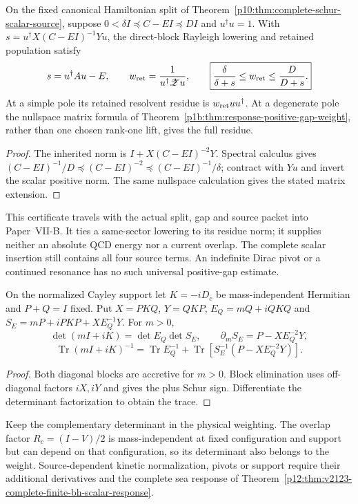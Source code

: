 \documentclass[12pt,a4paper]{article}
\begin{document}
\begin{corollary}
\label{p10:cor:schur-positive-gap-weight}
On the fixed canonical Hamiltonian split of
Theorem~\ref{p10:thm:complete-schur-scalar-source}, suppose
$0<\delta I\preceq C-EI\preceq DI$ and $u^\dagger u=1$.
With $s=u^\dagger X(C-EI)^{-1}Yu$, the direct-block Rayleigh lowering
and retained population satisfy
\[
 s=u^\dagger Au-E,\qquad
 w_{\rm ret}=\frac1{u^\dagger\mathscr Zu},\qquad
 \boxed{\frac{\delta}{\delta+s}\le w_{\rm ret}
                         \le\frac{D}{D+s}.}
\]
At a simple pole its retained resolvent residue is
$w_{\rm ret}uu^\dagger$.  At a degenerate pole the nullspace matrix
formula of Theorem~\ref{p1b:thm:response-positive-gap-weight}, rather than
one chosen rank-one lift, gives the full residue.
\end{corollary}
\begin{proof}
The inherited norm is $I+X(C-EI)^{-2}Y$.  Spectral calculus gives
$(C-EI)^{-1}/D\preceq(C-EI)^{-2}
\preceq(C-EI)^{-1}/\delta$; contract with $Yu$ and invert the scalar
positive norm.  The same nullspace calculation gives the stated matrix
extension.
\end{proof}
This certificate travels with the actual split, gap and source packet
into Paper~VII-B.  It ties a same-sector lowering to its residue norm;
it supplies neither an absolute QCD energy nor a current overlap.
The complete scalar insertion still contains all four source terms.
An indefinite Dirac pivot or a continued resonance has no such universal
positive-gap estimate.

\begin{corollary}
\label{p10:cor:complete-dirac-schur-source}
On the normalized Cayley support let $K=-iD_c$ be mass-independent
Hermitian and $P+Q=I$ fixed. Put $X=PKQ$, $Y=QKP$,
$E_Q=mQ+iQKQ$ and
$S_E=mP+iPKP+XE_Q^{-1}Y$. For $m>0$,
\[
 \det(mI+iK)=\det E_Q\det S_E,\qquad
 \partial_mS_E=P-XE_Q^{-2}Y,
\]
\[
 \boxed{\operatorname{Tr}(mI+iK)^{-1}
 =\operatorname{Tr}E_Q^{-1}
  +\operatorname{Tr}[S_E^{-1}(P-XE_Q^{-2}Y)].}
\]
\end{corollary}
\begin{proof}
Both diagonal blocks are accretive for $m>0$. Block elimination
uses off-diagonal factors $iX,iY$ and gives the plus Schur sign.
Differentiate the determinant factorization to obtain the trace.
\end{proof}
Keep the complementary determinant in the physical weighting.
The overlap factor $R_c=(I-V)/2$ is mass-independent at fixed
configuration and support but can depend on that configuration,
so its determinant also belongs to the weight.
Source-dependent kinetic normalization, pivots or support require
their additional derivatives and the complete sea response of
Theorem~\ref{p12:thm:v2123-complete-finite-bh-scalar-response}.
\end{document}
